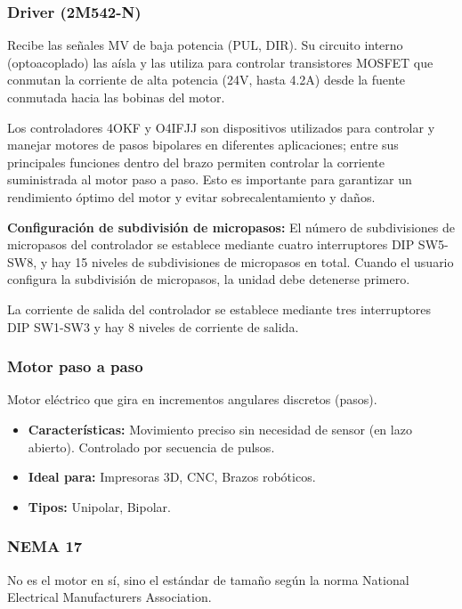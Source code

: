 \documentclass[11pt]{article}
\begin{document}
\subsubsection{Driver (2M542-N)}

Recibe las señales MV de baja potencia (PUL, DIR). Su circuito interno (optoacoplado) las aísla y las utiliza para controlar transistores MOSFET que conmutan la corriente de alta potencia (24V, hasta 4.2A) desde la fuente conmutada hacia las bobinas del motor.

Los controladores 4OKF y O4IFJJ son dispositivos utilizados para controlar y manejar motores de pasos bipolares en diferentes aplicaciones; entre sus principales funciones dentro del brazo permiten controlar la corriente suministrada al motor paso a paso. Esto es importante para garantizar un rendimiento óptimo del motor y evitar sobrecalentamiento y daños.

\textbf{Configuración de subdivisión de micropasos:} El número de subdivisiones de micropasos del controlador se establece mediante cuatro interruptores DIP SW5-SW8, y hay 15 niveles de subdivisiones de micropasos en total. Cuando el usuario configura la subdivisión de micropasos, la unidad debe detenerse primero.

La corriente de salida del controlador se establece mediante tres interruptores DIP SW1-SW3 y hay 8 niveles de corriente de salida.

\subsubsection{Motor paso a paso}

Motor eléctrico que gira en incrementos angulares discretos (pasos).

\begin{itemize}
	\item \textbf{Características:} Movimiento preciso sin necesidad de sensor (en lazo abierto). Controlado por secuencia de pulsos.
	\item \textbf{Ideal para:} Impresoras 3D, CNC, Brazos robóticos.
	\item \textbf{Tipos:} Unipolar, Bipolar.
\end{itemize}

\subsubsection{NEMA 17}

No es el motor en sí, sino el estándar de tamaño según la norma National Electrical Manufacturers Association.
\end{document}
